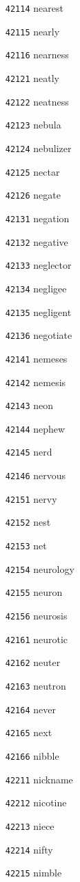 \documentclass[twoside,11pt]{article}
\begin{document}
\begin{multicols}{5}
\begin{enumerate}
\item[\texttt{42114}] nearest
\item[\texttt{42115}] nearly
\item[\texttt{42116}] nearness
\item[\texttt{42121}] neatly
\item[\texttt{42122}] neatness
\item[\texttt{42123}] nebula
\item[\texttt{42124}] nebulizer
\item[\texttt{42125}] nectar
\item[\texttt{42126}] negate
\item[\texttt{42131}] negation
\item[\texttt{42132}] negative
\item[\texttt{42133}] neglector
\item[\texttt{42134}] negligee
\item[\texttt{42135}] negligent
\item[\texttt{42136}] negotiate
\item[\texttt{42141}] nemeses
\item[\texttt{42142}] nemesis
\item[\texttt{42143}] neon
\item[\texttt{42144}] nephew
\item[\texttt{42145}] nerd
\item[\texttt{42146}] nervous
\item[\texttt{42151}] nervy
\item[\texttt{42152}] nest
\item[\texttt{42153}] net
\item[\texttt{42154}] neurology
\item[\texttt{42155}] neuron
\item[\texttt{42156}] neurosis
\item[\texttt{42161}] neurotic
\item[\texttt{42162}] neuter
\item[\texttt{42163}] neutron
\item[\texttt{42164}] never
\item[\texttt{42165}] next
\item[\texttt{42166}] nibble
\item[\texttt{42211}] nickname
\item[\texttt{42212}] nicotine
\item[\texttt{42213}] niece
\item[\texttt{42214}] nifty
\item[\texttt{42215}] nimble

\end{enumerate}
\end{multicols}
\end{document}
